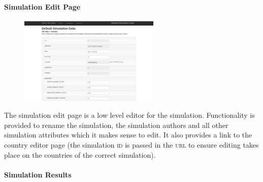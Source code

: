 \paragraph{Simulation Edit Page}

\begin{figure}[h!]
	\centering
	\includegraphics[width=0.6\textwidth]{img/ui3.png}
	\caption{}
\end{figure}
 
The simulation edit page is a low level editor for the simulation. Functionality is provided to rename the simulation, the simulation authors and all other simulation attributes which it makes sense to edit. It also provides a link to the country editor page (the simulation \textsc{id} is passed in the \textsc{url} to ensure editing takes place on the countries of the correct simulation).

\paragraph{Simulation Results} %

%
%
